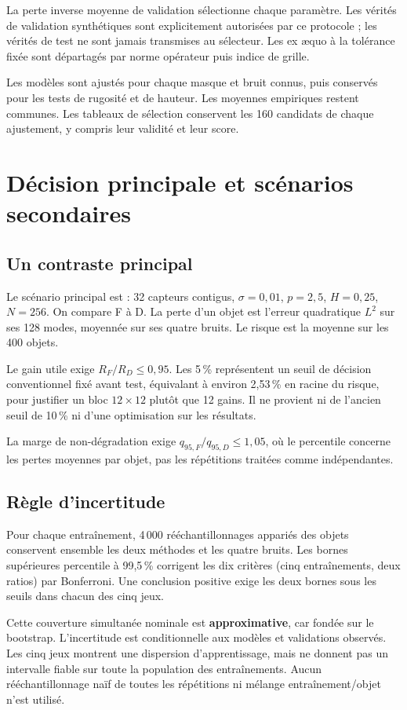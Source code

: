 \documentclass[11pt,a4paper]{article}
\begin{document}
La perte inverse moyenne de validation sélectionne chaque paramètre. Les vérités de validation synthétiques sont explicitement autorisées par ce protocole ; les vérités de test ne sont jamais transmises au sélecteur. Les ex æquo à la tolérance fixée sont départagés par norme opérateur puis indice de grille.

Les modèles sont ajustés pour chaque masque et bruit connus, puis conservés pour les tests de rugosité et de hauteur. Les moyennes empiriques restent communes. Les tableaux de sélection conservent les 160 candidats de chaque ajustement, y compris leur validité et leur score.

\newpage
\section{Décision principale et scénarios secondaires}
\subsection{Un contraste principal}
Le scénario principal est : 32 capteurs contigus, $\sigma=0,01$, $p=2,5$, $H=0,25$, $N=256$. On compare F à D. La perte d'un objet est l'erreur quadratique $L^2$ sur ses 128 modes, moyennée sur ses quatre bruits. Le risque est la moyenne sur les 400 objets.

Le gain utile exige $R_F/R_D\leq0,95$. Les 5\,\% représentent un seuil de décision conventionnel fixé avant test, équivalant à environ 2,53\,\% en racine du risque, pour justifier un bloc $12\times12$ plutôt que 12 gains. Il ne provient ni de l'ancien seuil de 10\,\% ni d'une optimisation sur les résultats.

La marge de non-dégradation exige $q_{95,F}/q_{95,D}\leq1,05$, où le percentile concerne les pertes moyennes par objet, pas les répétitions traitées comme indépendantes.

\subsection{Règle d'incertitude}
Pour chaque entraînement, 4\,000 rééchantillonnages appariés des objets conservent ensemble les deux méthodes et les quatre bruits. Les bornes supérieures percentile à 99,5\,\% corrigent les dix critères (cinq entraînements, deux ratios) par Bonferroni. Une conclusion positive exige les deux bornes sous les seuils dans chacun des cinq jeux.

Cette couverture simultanée nominale est \textbf{approximative}, car fondée sur le bootstrap. L'incertitude est conditionnelle aux modèles et validations observés. Les cinq jeux montrent une dispersion d'apprentissage, mais ne donnent pas un intervalle fiable sur toute la population des entraînements. Aucun rééchantillonnage naïf de toutes les répétitions ni mélange entraînement/objet n'est utilisé.
\end{document}
